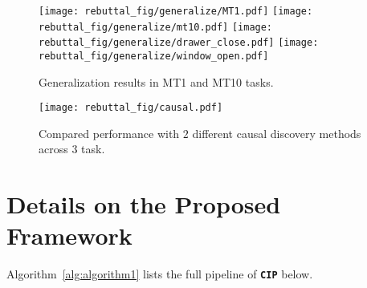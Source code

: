 


\begin{figure}[t]
    \centering
    \texttt{[image: rebuttal\_fig/generalize/MT1.pdf]}
    \texttt{[image: rebuttal\_fig/generalize/mt10.pdf]}
    \texttt{[image: rebuttal\_fig/generalize/drawer\_close.pdf]}
    \texttt{[image: rebuttal\_fig/generalize/window\_open.pdf]}
    \caption{Generalization results in MT1 and MT10 tasks.}
    \label{fig:gen}
\end{figure}

\clearpage

\begin{figure}[t]
    \centering
    \texttt{[image: rebuttal\_fig/causal.pdf]}
    \caption{Compared performance with $2$ different causal discovery methods across $3$ task.}
    \label{fig:appendix_causal}
\end{figure}

\section{Details on the Proposed Framework}
\label{Details on the Proposed Framework}

Algorithm~\ref{alg:algorithm1} lists the full pipeline of \texttt{\textbf{CIP}} below. 

